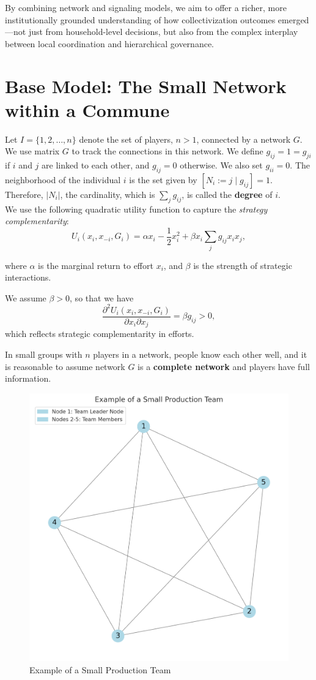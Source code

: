 \documentclass[12pt]{article}
\begin{document}
By combining network and signaling models, we aim to offer a richer, more institutionally grounded understanding of how collectivization outcomes emerged—not just from household-level decisions, but also from the complex interplay between local coordination and hierarchical governance.\\

\section{Base Model: The Small Network within a Commune}
Let $I = \{1, 2, \dots, n\}$ denote the set of players, $n > 1$, connected by a network $G$. We use matrix $G$ to track the connections in this network. We define $g_{ij} = 1=g_{ji}$ if $i$ and $j$ are linked to each other, and $g_{ij} = 0$ otherwise.  We also set $g_{ii} = 0$. The neighborhood of the individual $i$ is the set given by $[ N_i := j \mid g_{ij}] = 1$. Therefore, $|N_i|$, the cardinality, which is $\sum_j g_{ij}$, is called the \textbf{degree} of $i$.\\

We use the following quadratic utility function to capture the \emph{strategy complementarity}:
\[
U_i(x_i, x_{-i}, G_i) = \alpha x_i - \frac{1}{2} x_i^2 + \beta x_i \sum_j g_{ij}x_i  x_j,
\]

where $\alpha$ is the marginal return to effort $x_i$, and $\beta$ is the strength of strategic interactions.

We assume $\beta > 0$, so that we have
\[
\frac{\partial^2 U_i(x_i, x_{-i}, G_i)}{\partial x_i \partial x_j} = \beta g_{ij} > 0,
\]
which reflects strategic complementarity in efforts.

In small groups with $n$ players in a network, people know each other well, and it is reasonable to assume network $G$ is a \textbf{complete network} and players have full information.

\begin{figure}[H]
  \centering
  \includegraphics[height=0.6\textwidth]{small network1.png}
  \caption{Example of a Small Production Team}
  \label{fig:small-team}
\end{figure}
\end{document}
